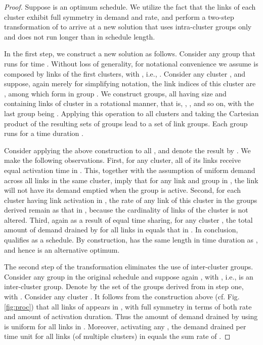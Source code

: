 \documentclass[10pt,onecolumn,journal,draftcls,oneside]{IEEEtran}
\newcounter{cond}
\newcounter{rema}
\begin{document}
\begin{proof}
Suppose  is an optimum schedule.
We utilize the fact that the links of each cluster exhibit
full symmetry in demand and rate, and perform a two-step
transformation of  to arrive at a new solution that uses
intra-cluster groups only and does not run longer than  in
schedule length.

In the first step, we construct a new solution  as follows. Consider any group  that runs
for time .
Without loss of generality, for notational convenience we assume
 is composed by links of the first  clusters, with , i.e., .
Consider any cluster , and suppose,
again merely for simplifying notation, the link indices of this
cluster are , among which  form
 in group . We construct  groups, all having
size  and containing links of cluster  in a rotational manner,
that is, , , and so on, with the last group being .
Applying this operation to all clusters  and taking
the Cartesian product of the resulting sets of groups lead to a set of
 link groups. Each group runs for a time duration . 

Consider applying the above construction to all , and
denote the result by . We make the following
observations. First, for any cluster, all of its links receive equal
activation time in .  This, together with the assumption
of uniform demand across all links in the same cluster, imply that for any link and group in , the link will not have its demand emptied when the group is
active. Second, for each cluster having link activation in , the rate of any link of this cluster in the groups derived 
remain as that in , because
the cardinality of links of the cluster is not altered.
Third, again as a result of equal time sharing,
for any cluster , the total amount of demand drained 
by  for all links in  equals that in .
In conclusion,  qualifies as a schedule.
By construction,  has the same length in
time duration as , and hence 
is an alternative optimum.

The second step of the transformation eliminates the use of inter-cluster
groups. Consider any group  in the original schedule 
and suppose again ,
with , i.e.,
 is an inter-cluster group. 
Denote by  the set of the groups derived from  in step one,
with . Consider any cluster . It follows from the construction above (cf. Fig. \ref{fig:proc}) that all
links of  appears in , with full symmetry in
terms of both rate and amount of activation duration.  Thus the amount
of demand drained by using  is uniform for all
links in . Moreover, activating any , the demand drained per time unit for all links (of
multiple clusters) in  equals the sum rate of .



\end{proof}
\end{document}
